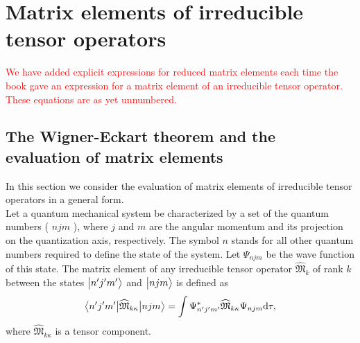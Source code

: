 \chapter{Matrix elements of irreducible tensor operators}\label{chap:13}
\textcolor{red}{We have added explicit expressions for reduced matrix elements each time the book gave an expression for a matrix element of an irreducible tensor operator. These equations are as yet unnumbered.}
\section{The Wigner-Eckart theorem and the evaluation of matrix elements}\label{sec:13.1}
In this section we consider the evaluation of matrix elements of irreducible tensor operators in a general form.\\
Let a quantum mechanical system be characterized by a set of the quantum numbers ( \(n j m\) ), where \(j\) and \(m\) are the angular momentum and its projection on the quantization axis, respectively. The symbol \(n\) stands for all other quantum numbers required to define the state of the system. Let \(\Psi_{n j m}\) be the wave function of this state. The matrix element of any irreducible tensor operator \(\widehat{\mathfrak{M}}_{k}\) of rank \(k\) between the states \(\bigl| n^{\prime} j^{\prime} m^{\prime} \bigr\rangle\) and \(\bigl| n j m \bigr\rangle\) is defined as
\begin{equation}
\bigl\langle  n^{\prime} j^{\prime} m^{\prime} \big|  \widehat{\mathfrak{M}}_{k \kappa} \big| n j m \bigr\rangle=\int \Psi_{n^{\prime} j^{\prime} m^{\prime}}^{*} \widehat{\mathfrak{M}}_{k \kappa} \Psi_{n j m} \mathrm{d} \tau ,\label{eq:13:1:1}
\end{equation}
where \(\widehat{\mathfrak{M}}_{k \kappa}\) is a tensor component.

